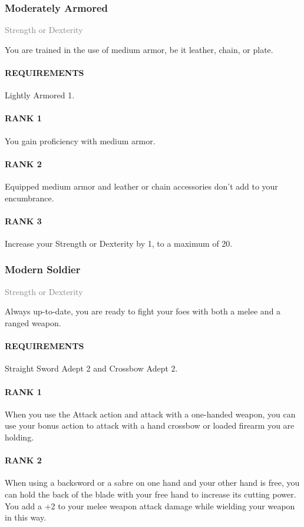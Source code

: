\subsubsection{Moderately Armored} \label{feat::moderatelyarmored}
\small{\textcolor{gray}{Strength or Dexterity}}

\normalsize
You are trained in the use of medium armor, be it leather, chain, or plate.
\paragraph{REQUIREMENTS} Lightly Armored 1.
\paragraph{RANK 1} You gain proficiency with medium armor.
\paragraph{RANK 2} Equipped medium armor and leather or chain accessories don't add to your encumbrance.
\paragraph{RANK 3} Increase your Strength or Dexterity by 1, to a maximum of 20.

\subsubsection{Modern Soldier} \label{feat::modernsoldier}
\small{\textcolor{gray}{Strength or Dexterity}}

\normalsize
Always up-to-date, you are ready to fight your foes with both a melee and a ranged weapon.
\paragraph{REQUIREMENTS} Straight Sword Adept 2 and Crossbow Adept 2.
\paragraph{RANK 1} When you use the Attack action and attack with a one-handed weapon, you can use your bonus action to attack with a hand crossbow or loaded firearm you are holding.
\paragraph{RANK 2} When using a backsword or a sabre on one hand and your other hand is free, you can hold the back of the blade with your free hand to increase its cutting power.
You add a +2 to your melee weapon attack damage while wielding your weapon in this way.

